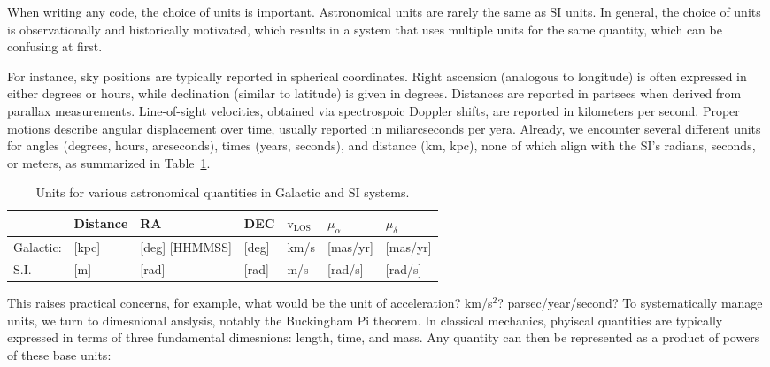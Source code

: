     When writing any code, the choice of units is important. Astronomical units are rarely the same as SI units. In general, the choice of units is observationally and historically motivated, which results in a system that uses multiple units for the same quantity, which can be confusing at first. 
    
    For instance, sky positions are typically reported in spherical coordinates. Right ascension (analogous to longitude) is often expressed in either degrees or hours, while declination (similar to latitude) is given in degrees. Distances are reported in partsecs when derived from parallax measurements. Line-of-sight velocities, obtained via spectrospoic Doppler shifts, are reported in kilometers per second. Proper motions describe angular displacement over time, usually reported in miliarcseconds per yera. Already, we encounter several different units for angles (degrees, hours, arcseconds), times (years, seconds), and distance (km, kpc), none of which align with the SI's radians, seconds, or meters, as summarized in Table~\ref{tab:units}.

    \begin{table}[]
        \caption{Units for various astronomical quantities in Galactic and SI systems.}
        \label{tab:units}
        \begin{tabular}{l|l|l|l|l|l|l|}
                            & Distance  & RA                     & DEC                    & \textbf{$\mathrm{v}_\mathrm{LOS}$} & $\mu_\alpha$ & $\mu_\delta$ \\ \hline
            Galactic: & {[}kpc{]} & {[}deg{]} {[}HHMMSS{]} & {[}deg{]}  & km/s                      & {[}mas/yr{]} & {[}mas/yr{]} \\ \hline
            S.I.       & {[}m{]}   & {[}rad{]}              & {[}rad{]}              & m/s                       & {[}rad/s{]}  & {[}rad/s{]}  \\ 
        \end{tabular}
    \end{table}

    This raises practical concerns, for example, what would be the unit of acceleration? km/s$^2$? parsec/year/second? To systematically manage units, we turn to dimesnional anslysis, notably the Buckingham Pi theorem. In classical mechanics, phyiscal quantities are typically expressed in terms of three fundamental dimesnions: length, time, and mass. Any quantity can then be represented as a product of powers of these base units: 

